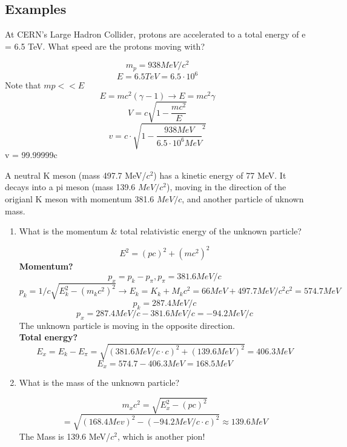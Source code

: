 \documentclass[class=article,crop=false]{standalone}
\begin{document}
\lecture
\subsection{Examples}
\begin{question}
	At CERN's Large Hadron Collider, protons are accelerated to a total energy of e = 6.5 TeV. What speed are the protons moving with?
	\begin{answer}[Answer]
		$$ m_p = 938 MeV/c^2 $$
		$$ E = 6.5 TeV = 6.5 \cdot 10^6 $$
		Note that $mp << E$
		$$ E = mc^2(\gamma - 1) \rightarrow E = mc^2\gamma $$
		$$ V = c\sqrt{1-\frac{mc^2}{E}} $$
		$$ v = c \cdot \sqrt{1 - \frac{938 MeV}{6.5 \cdot 10^6 MeV}^2} $$
		v = 99.99999c
	\end{answer}
\end{question}

\newpage
\begin{question}
	A neutral K meson (mass 497.7 MeV/$c^2$) has a kinetic energy of 77 MeV. It decays into a pi meson (mass 139.6 $MeV/c^2$), moving in the direction of the origianl K meson with momentum 381.6 $MeV/c$, and another particle of uknown mass. 
	\begin{enumerate}
		\item What is the momentum & total relativistic energy of the unknown particle?
	\begin{answer}[1]
		$$ E^2 = (pc)^2 + (mc^2)^2 $$
		\textbf{Momentum?}
		$$ p_x = p_k - p_\pi, p_\pi = 381.6 MeV/c $$
		$$ p_k = 1/c \sqrt{E_k^2 - (m_kc^2)^2} \rightarrow E_k = K_k + M_kc^2 = 66 MeV + 497.7 MeV/c^2 c^2 = 574.7 MeV $$
		$$ p_k = 287.4 MeV/c $$
		$$ p_x = 287.4 MeV/c - 381.6 MeV/c = -94.2 MeV/c $$
		The unknown particle is moving in the opposite direction. \\
		
		\textbf{Total energy?} \\
		$$ E_x = E_k - E_\pi = \sqrt{(381.6 MeV/c \cdot c)^2 + (139.6 MeV)^2} = 406.3 MeV $$
		$$ E_x = 574.7 - 406.3 MeV = 168.5 MeV $$
	\end{answer}
		\item What is the mass of the unknown particle?
	\begin{answer}[2]
		$$m_x c^2 = \sqrt{E_x^2 - (pc)^2} $$
		$$ = \sqrt{(168.4 Mev)^2 - (-94.2 MeV/c \cdot c)^2} \approx 139.6 MeV $$
		The Mass is 139.6 MeV/$c^2$, which is another pion!
	\end{answer}
	\end{enumerate}
\end{question}
\end{document}
